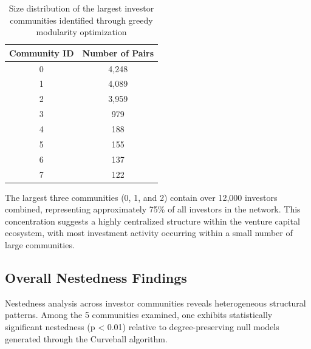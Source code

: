 
\begin{table}[htbp]
\centering
\begin{tabular}{|c|c|}
\hline
\textbf{Community ID} & \textbf{Number of Pairs} \\
\hline
0 & 4,248 \\
1 & 4,089 \\
2 & 3,959 \\
3 & 979 \\
4 & 188 \\
5 & 155 \\
6 & 137 \\
7 & 122 \\
\hline
\end{tabular}
\caption{Size distribution of the largest investor communities identified through greedy modularity optimization}
\label{tab:community_sizes}
\end{table}

The largest three communities (0, 1, and 2) contain over 12,000 investors combined, representing approximately 75\% of all investors in the network. This concentration suggests a highly centralized structure within the venture capital ecosystem, with most investment activity occurring within a small number of large communities. 




\subsection{Overall Nestedness Findings}

\newcommand{\numCommAnalysedNestedness}{5}

Nestedness analysis across investor communities reveals heterogeneous structural patterns. Among the \numCommAnalysedNestedness{} communities examined, one exhibits statistically significant nestedness (p < 0.01) relative to degree-preserving null models generated through the Curveball algorithm.

